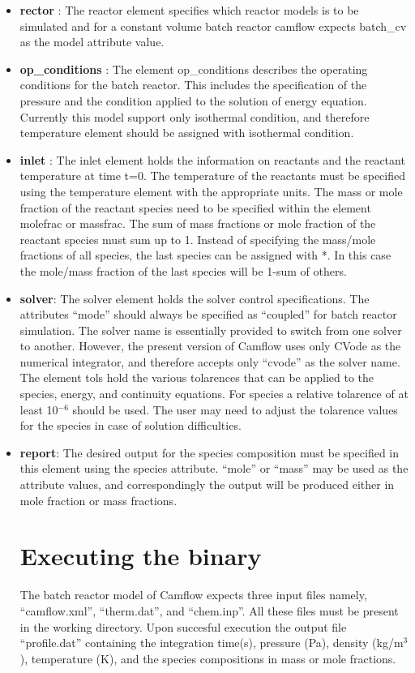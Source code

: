 \begin{itemize}
 \item \textbf{rector} : The reactor element specifies which reactor models is to be simulated and for a constant volume batch reactor camflow expects batch\_cv as the model attribute value.

\item \textbf{op\_conditions} : The element op\_conditions describes the operating conditions for the batch reactor. This includes the specification of the pressure and the condition applied to the solution of energy equation. Currently this model support only isothermal condition, and therefore temperature element should be assigned with isothermal condition.
\item \textbf{inlet} : The inlet element holds the information on reactants and the reactant temperature at time t=0. The temperature of the reactants must be specified using the temperature element with the appropriate units. The mass or mole fraction of the reactant species need to be specified within the element molefrac or massfrac. The sum of mass fractions or mole fraction of the reactant species must sum up to 1. Instead of specifying the mass/mole fractions of all species, the last species can be assigned with *. In this case the mole/mass fraction of the last species will be 1-sum of others.

\item \textbf{solver}: The solver element holds the solver control specifications. The attributes ``mode'' should always be specified as ``coupled'' for batch reactor simulation. The solver name is essentially provided to switch from one solver to another. However, the present version of Camflow uses only CVode as the numerical integrator, and therefore accepts only ``cvode'' as the solver name. The element tols hold the various tolarences that can be applied to the species, energy, and continuity equations. For species a relative tolarence of at least 10$^{-6}$ should be used. The user may need to adjust the tolarence values for the species in case of solution difficulties.

\item \textbf{report}: The desired output for the species composition must be specified in this element using the species attribute. ``mole'' or ``mass'' may be used as the attribute values, and correspondingly the output will be produced either in mole fraction or mass fractions.

\section{Executing the binary}
The batch reactor model of Camflow expects three input files namely, ``camflow.xml'', ``therm.dat'', and ``chem.inp''. All these files must be present in the working directory. Upon succesful execution the output file ``profile.dat'' containing the integration time(s), pressure (Pa), density (kg/m$^3$), temperature (K), and the species compositions in mass or mole fractions.
\end{itemize}

